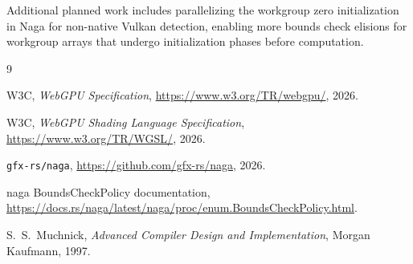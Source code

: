 \documentclass[11pt,a4paper]{article}
\begin{document}
Additional planned work includes parallelizing the workgroup zero
initialization in Naga for non-native Vulkan detection, enabling more
bounds check elisions for workgroup arrays that undergo initialization
phases before computation.

\footnotesize
\begin{thebibliography}{9}

W3C, \textit{WebGPU Specification},
\url{https://www.w3.org/TR/webgpu/}, 2026.

W3C, \textit{WebGPU Shading Language Specification},
\url{https://www.w3.org/TR/WGSL/}, 2026.

\texttt{gfx-rs/naga}, \url{https://github.com/gfx-rs/naga}, 2026.

naga BoundsCheckPolicy documentation,
\url{https://docs.rs/naga/latest/naga/proc/enum.BoundsCheckPolicy.html}.

S.~S.~Muchnick,
\textit{Advanced Compiler Design and Implementation},
Morgan Kaufmann, 1997.

\end{thebibliography}
\end{document}
